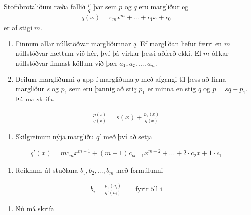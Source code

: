 \documentclass[a4paper,10pt,icelandic]{sphinxmanual}
\begin{document}
Stofnbrotaliðum ræða fallið \(\frac{p}{q}\) þar sem \(p\) og \(q\) eru margliður og
\begin{equation*}
\begin{split}q(x)=c_mx^m+...+c_1x+c_0\end{split}
\end{equation*}
er af stigi \(m\).
\begin{enumerate}
%
\item {} 
Finnum allar núllstöðvar margliðunnar \(q\). Ef margliðan hefur færri en \(m\) núllstöðvar hættum við hér, því þá virkar þessi aðferð ekki. Ef \(m\) ólíkar núllstöðvar finnast köllum við þær \(a_1,a_2,...,a_m\).

\item {} 
Deilum margliðunni \(q\) upp í margliðuna \(p\) með afgangi til þess að finna margliður \(s\) og \(p_1\) sem eru þannig að stig \(p_1\) er minna en stig \(q\) og \(p=sq+p_1\). Þá má skrifa:

\end{enumerate}
\begin{equation*}
\begin{split}\frac{p(x)}{q(x)}=s(x)+\frac{p_1(x)}{q(x)}\end{split}
\end{equation*}\begin{enumerate}
%
\setcounter{enumi}{2}
\item {} 
Skilgreinum nýja margliðu \(q'\) með því að setja

\end{enumerate}
\begin{equation*}
\begin{split}q'(x)=mc_mx^{m-1}+(m-1)c_{m-1}x^{m-2}+...+2\cdot c_2x+1\cdot c_1\end{split}
\end{equation*}\begin{enumerate}
%
\setcounter{enumi}{3}
\item {} 
Reiknum út stuðlana \(b_1,b_2,...,b_m\) með formúlunni

\end{enumerate}
\begin{equation*}
\begin{split}b_i=\frac{p_1(a_i)}{q'(a_i)} \qquad \text{fyrir öll i}\end{split}
\end{equation*}\begin{enumerate}
%
\setcounter{enumi}{4}
\item {} 
Nú má skrifa

\end{enumerate}
\end{document}
